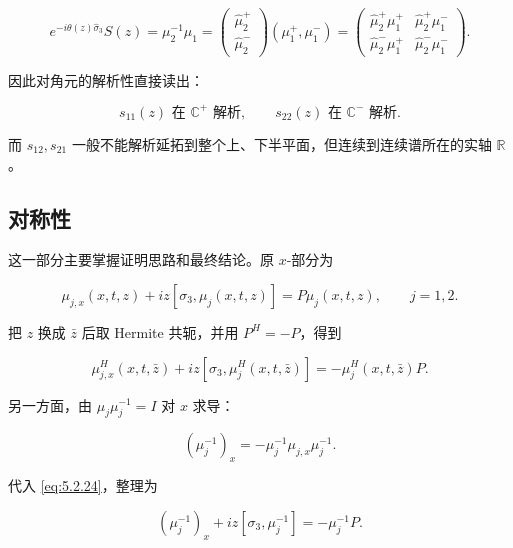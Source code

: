 \documentclass[
    lang=cn,
    scheme=chinese,
    mode=simple,
    device=normal,
    color=blue,
    math=cm,
    thmcnt=section,
    12pt,
    nowatermark
]{elegantbook}
\begin{document}
\[
    e^{-i\theta(z)\widehat{\sigma}_3}S(z)
    =
    \mu_2^{-1}\mu_1
    =
    \begin{pmatrix}
        \widehat\mu_2^+ \\
        \widehat\mu_2^-
    \end{pmatrix}
    (\mu_1^+,\mu_1^-)
    =
    \begin{pmatrix}
        \widehat\mu_2^+\mu_1^+ & \widehat\mu_2^+\mu_1^- \\
        \widehat\mu_2^-\mu_1^+ & \widehat\mu_2^-\mu_1^-
    \end{pmatrix}.
\]

因此对角元的解析性直接读出：

\[
    s_{11}(z)\text{ 在 }\mathbb{C}^+\text{ 解析},
    \qquad
    s_{22}(z)\text{ 在 }\mathbb{C}^-\text{ 解析}.
\]

而 $s_{12},s_{21}$ 一般不能解析延拓到整个上、下半平面，但连续到连续谱所在的实轴 $\mathbb{R}$。

\subsection{对称性}

这一部分主要掌握证明思路和最终结论。原 $x$-部分为

\begin{equation}
    \mu_{j,x}(x,t,z)
    +
    iz[\sigma_3,\mu_j(x,t,z)]
    =
    P\mu_j(x,t,z),
    \qquad j=1,2.
    \tag{5.2.24}
    \label{eq:5.2.24}
\end{equation}

把 $z$ 换成 $\bar z$ 后取 Hermite 共轭，并用 $P^H=-P$，得到

\begin{equation}
    \mu_{j,x}^H(x,t,\bar z)
    +
    iz[\sigma_3,\mu_j^H(x,t,\bar z)]
    =
    -\mu_j^H(x,t,\bar z)P.
    \tag{5.2.25}
    \label{eq:5.2.25}
\end{equation}

另一方面，由 $\mu_j\mu_j^{-1}=I$ 对 $x$ 求导：

\begin{equation}
    (\mu_j^{-1})_x
    =
    -\mu_j^{-1}\mu_{j,x}\mu_j^{-1}.
    \tag{5.2.26}
    \label{eq:5.2.26}
\end{equation}

代入 \eqref{eq:5.2.24}，整理为

\begin{equation}
    (\mu_j^{-1})_x
    +
    iz[\sigma_3,\mu_j^{-1}]
    =
    -\mu_j^{-1}P.
    \tag{5.2.27}
    \label{eq:5.2.27}
\end{equation}
\end{document}
